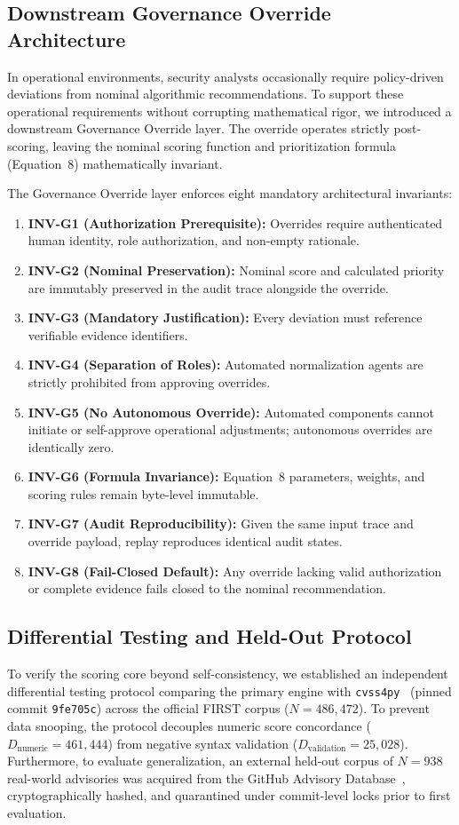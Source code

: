 \documentclass[conference]{IEEEtran}
\begin{document}
\subsection{Downstream Governance Override Architecture}
\label{sec:governance_override}
In operational environments, security analysts occasionally require policy-driven deviations from nominal algorithmic recommendations. To support these operational requirements without corrupting mathematical rigor, we introduced a downstream Governance Override layer. The override operates strictly post-scoring, leaving the nominal scoring function and prioritization formula (Equation~8) mathematically invariant.

The Governance Override layer enforces eight mandatory architectural invariants:
\begin{enumerate}
\item \textbf{INV-G1 (Authorization Prerequisite):} Overrides require authenticated human identity, role authorization, and non-empty rationale.
\item \textbf{INV-G2 (Nominal Preservation):} Nominal score and calculated priority are immutably preserved in the audit trace alongside the override.
\item \textbf{INV-G3 (Mandatory Justification):} Every deviation must reference verifiable evidence identifiers.
\item \textbf{INV-G4 (Separation of Roles):} Automated normalization agents are strictly prohibited from approving overrides.
\item \textbf{INV-G5 (No Autonomous Override):} Automated components cannot initiate or self-approve operational adjustments; autonomous overrides are identically zero.
\item \textbf{INV-G6 (Formula Invariance):} Equation~8 parameters, weights, and scoring rules remain byte-level immutable.
\item \textbf{INV-G7 (Audit Reproducibility):} Given the same input trace and override payload, replay reproduces identical audit states.
\item \textbf{INV-G8 (Fail-Closed Default):} Any override lacking valid authorization or complete evidence fails closed to the nominal recommendation.
\end{enumerate}

\subsection{Differential Testing and Held-Out Protocol}
\label{sec:diff_and_heldout_methods}
To verify the scoring core beyond self-consistency, we established an independent differential testing protocol comparing the primary engine with \texttt{cvss4py}~\cite{cvss4py} (pinned commit \texttt{9fe705c}) across the official FIRST corpus ($N=486,472$). To prevent data snooping, the protocol decouples numeric score concordance ($D_{\text{numeric}} = 461,444$) from negative syntax validation ($D_{\text{validation}} = 25,028$). Furthermore, to evaluate generalization, an external held-out corpus of $N=938$ real-world advisories was acquired from the GitHub Advisory Database~\cite{gh_advisory_database}, cryptographically hashed, and quarantined under commit-level locks prior to first evaluation.
\end{document}
